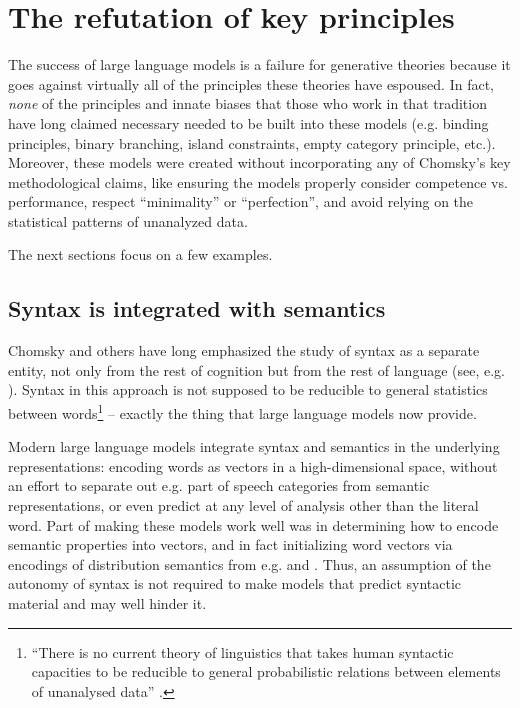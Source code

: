 \documentclass[output=paper,colorlinks,citecolor=brown]{langscibook}
\begin{document}
\section{The refutation of key principles}

The success of large language models is a failure for generative theories because it goes against virtually all of the principles these theories have espoused.  In fact, \textit{none} of the principles and innate biases that those who work in that tradition have long claimed necessary needed to be built into these models (e.g. binding principles, binary branching, island constraints, empty category principle, etc.). Moreover, these models were created without incorporating any of Chomsky's key methodological claims, like ensuring the models properly consider competence vs. performance, respect ``minimality'' or ``perfection'', and avoid relying on the statistical patterns of unanalyzed data.

The next sections focus on a few examples. 

\subsection{Syntax is integrated with semantics}
Chomsky and others have long emphasized the study of syntax as a separate entity, not only from the rest of cognition but from the rest of language (see, e.g. \citealt{chomsky1957syntactic,croft1995autonomy,newmeyer1991functional,adger2018autonomy}). Syntax in this approach is not supposed to be reducible to general statistics between words\footnote{``There is no current theory of linguistics
that takes human syntactic capacities to be reducible to general probabilistic relations between elements of unanalysed data'' \citep{adger2018autonomy}.} -- exactly the thing that large language models now provide. 

Modern large language models integrate syntax and semantics in the underlying representations:
encoding words as vectors in a high-dimensional space, without an effort to separate out e.g. part
of speech categories from semantic representations, or even predict at any level of analysis other
than the literal word. Part of making these models work well was in determining how to encode
semantic properties into vectors, and in fact initializing word vectors via encodings of
distribution semantics from e.g. \citet{mikolov2013distributed} and \citet{radford2019language}. Thus, an assumption of the autonomy of syntax is not required to make models that predict syntactic material and may well hinder it. 
\end{document}
